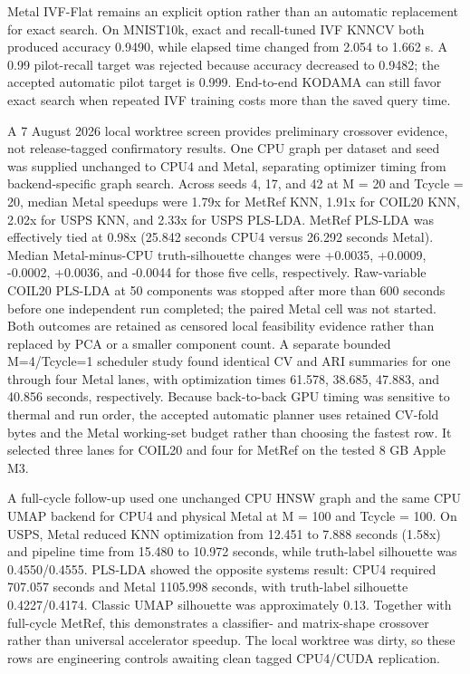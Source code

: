 \documentclass[twoside,11pt]{article}
\begin{document}
\begin{small}
Metal IVF-Flat remains an explicit option rather than an automatic replacement for exact search. On MNIST10k, exact and recall-tuned IVF KNNCV both produced accuracy 0.9490, while elapsed time changed from 2.054 to 1.662 s. A 0.99 pilot-recall target was rejected because accuracy decreased to 0.9482; the accepted automatic pilot target is 0.999. End-to-end KODAMA can still favor exact search when repeated IVF training costs more than the saved query time.

A 7 August 2026 local worktree screen provides preliminary crossover evidence, not release-tagged confirmatory results. One CPU graph per dataset and seed was supplied unchanged to CPU4 and Metal, separating optimizer timing from backend-specific graph search. Across seeds 4, 17, and 42 at M = 20 and Tcycle = 20, median Metal speedups were 1.79x for MetRef KNN, 1.91x for COIL20 KNN, 2.02x for USPS KNN, and 2.33x for USPS PLS-LDA. MetRef PLS-LDA was effectively tied at 0.98x (25.842 seconds CPU4 versus 26.292 seconds Metal). Median Metal-minus-CPU truth-silhouette changes were +0.0035, +0.0009, -0.0002, +0.0036, and -0.0044 for those five cells, respectively. Raw-variable COIL20 PLS-LDA at 50 components was stopped after more than 600 seconds before one independent run completed; the paired Metal cell was not started. Both outcomes are retained as censored local feasibility evidence rather than replaced by PCA or a smaller component count. A separate bounded M=4/Tcycle=1 scheduler study found identical CV and ARI summaries for one through four Metal lanes, with optimization times 61.578, 38.685, 47.883, and 40.856 seconds, respectively. Because back-to-back GPU timing was sensitive to thermal and run order, the accepted automatic planner uses retained CV-fold bytes and the Metal working-set budget rather than choosing the fastest row. It selected three lanes for COIL20 and four for MetRef on the tested 8 GB Apple M3.

A full-cycle follow-up used one unchanged CPU HNSW graph and the same CPU UMAP backend for CPU4 and physical Metal at M = 100 and Tcycle = 100. On USPS, Metal reduced KNN optimization from 12.451 to 7.888 seconds (1.58x) and pipeline time from 15.480 to 10.972 seconds, while truth-label silhouette was 0.4550/0.4555. PLS-LDA showed the opposite systems result: CPU4 required 707.057 seconds and Metal 1105.998 seconds, with truth-label silhouette 0.4227/0.4174. Classic UMAP silhouette was approximately 0.13. Together with full-cycle MetRef, this demonstrates a classifier- and matrix-shape crossover rather than universal accelerator speedup. The local worktree was dirty, so these rows are engineering controls awaiting clean tagged CPU4/CUDA replication.


\end{small}
\end{document}
